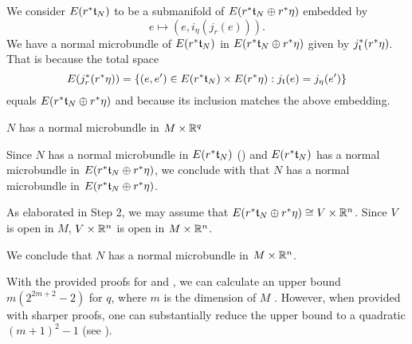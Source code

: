 \begin{scope}
\begin{myproof}
\begin{steps}
We consider $E(r^*\mathfrak{t}_N)$ to be a submanifold of $E(r^*\mathfrak{t}_N \oplus{} r^*\eta)$ embedded by \[ e \mapsto (e, i_{\eta}(j_{r}(e))). \] We have a normal microbundle of $E(r^*\mathfrak{t}_N)$ in $E(r^*\mathfrak{t}_N \oplus{} r^*\eta)$ given by $j_{\mathfrak{t}}^*(r^*\eta)$. That is because the total space \[ E(j_r^*(r^*\eta)) = \{(e, e') \in E(r^*\mathfrak{t}_N) \times E(r^*\eta):j_{\mathfrak{t}}(e) = j_\eta(e')\} \] equals $E(r^*\mathfrak{t}_N \oplus{} r^*\eta)$ and because its inclusion matches the above embedding.

\item $N$ has a normal microbundle in $M \times \mathbb{R}^q$

Since $N$ has a normal microbundle in $E(r^*\mathfrak{t}_N)$ () and $E(r^*\mathfrak{t}_N)$ has a normal microbundle in $E(r^*\mathfrak{t}_N \oplus{} r^*\eta)$, we conclude with  that $N$ has a normal microbundle in $E(r^*\mathfrak{t}_N \oplus{} r^*\eta)$.

As elaborated in Step 2, we may assume that $E(r^*\mathfrak{t}_N \oplus{} r^*\eta) \cong V \times \mathbb{R}^n$. Since $V$ is open in $M$, $V \times \mathbb{R}^n$ is open in $M \times \mathbb{R}^n$. \end{steps} We conclude that $N$ has a normal microbundle in $M \times \mathbb{R}^n$. \end{myproof}

\begin{myparagraph} With the provided proofs for  and , we can calculate an upper bound $m(2^{2m + 2} - 2)$ for $q$, where $m$ is the dimension of $M$ \cite[p.63]{milnor}. However, when provided with sharper proofs, one can substantially reduce the upper bound to a quadratic $(m + 1)^2 - 1$ (see \cite[p.232]{hirsch}). \end{myparagraph} \end{scope}